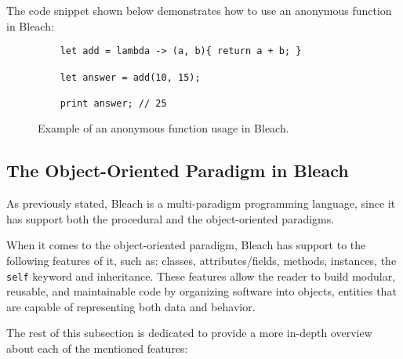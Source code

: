 The code snippet shown below demonstrates how to use an anonymous function in Bleach:

\begin{figure}[H]
    \centering
    \begin{lstlisting}
    let add = lambda -> (a, b){ return a + b; }
    
    let answer = add(10, 15);
    
    print answer; // 25
    \end{lstlisting}
    \caption{Example of an anonymous function usage in Bleach.}
\end{figure}


\subsection{The Object-Oriented Paradigm in Bleach}
As previously stated, Bleach is a multi-paradigm programming language, since it has support both the procedural and the object-oriented paradigms.

When it comes to the object-oriented paradigm, Bleach has support to the following features of it, such as: classes, attributes/fields, methods, instances, the \texttt{self} keyword and inheritance. These features allow the reader to build modular, reusable, and maintainable code by organizing software into objects, entities that are capable of representing both data and behavior.

The rest of this subsection is dedicated to provide a more in-depth overview about each of the mentioned features:

